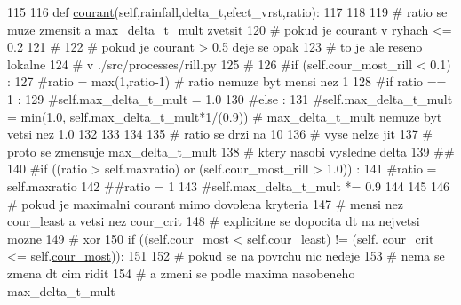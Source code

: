 \begin{DoxyCode}
115 
116   \textcolor{keyword}{def }\hyperlink{classsmoderp2d_1_1src_1_1courant_1_1Courant_a6a20926e1f36e2169eccdc27d92d787d}{courant}(self,rainfall,delta\_t,efect\_vrst,ratio):
117 
118 
119     \textcolor{comment}{# ratio se muze zmensit  a max\_delta\_t\_mult zvetsit}
120     \textcolor{comment}{# pokud je courant v ryhach <= 0.2}
121     \textcolor{comment}{#}
122     \textcolor{comment}{# pokud je courant > 0.5 deje se opak}
123     \textcolor{comment}{# to je ale reseno lokalne}
124     \textcolor{comment}{# v  ./src/processes/rill.py}
125     \textcolor{comment}{#}
126     \textcolor{comment}{#if (self.cour\_most\_rill < 0.1) :}
127       \textcolor{comment}{#ratio = max(1,ratio-1) # ratio nemuze byt mensi nez 1}
128       \textcolor{comment}{#if ratio == 1 :}
129         \textcolor{comment}{#self.max\_delta\_t\_mult = 1.0}
130       \textcolor{comment}{#else :}
131         \textcolor{comment}{#self.max\_delta\_t\_mult = min(1.0, self.max\_delta\_t\_mult*1/(0.9)) # max\_delta\_t\_mult nemuze byt
       vetsi nez 1.0}
132 
133 
134 
135     \textcolor{comment}{# ratio se drzi na 10}
136     \textcolor{comment}{# vyse nelze jit}
137     \textcolor{comment}{# proto se zmensuje max\_delta\_t\_mult}
138     \textcolor{comment}{# ktery nasobi vysledne delta}
139     \textcolor{comment}{##}
140     \textcolor{comment}{#if ((ratio > self.maxratio) or (self.cour\_most\_rill > 1.0)) :}
141       \textcolor{comment}{#ratio = self.maxratio}
142       \textcolor{comment}{##ratio = 1}
143       \textcolor{comment}{#self.max\_delta\_t\_mult *= 0.9}
144 
145 
146     \textcolor{comment}{# pokud je maximalni courant mimo dovolena kryteria}
147     \textcolor{comment}{# mensi nez cour\_least a vetsi nez cour\_crit}
148     \textcolor{comment}{# explicitne se dopocita dt na nejvetsi mozne}
149     \textcolor{comment}{#                                      xor}
150     \textcolor{keywordflow}{if} ((self.\hyperlink{classsmoderp2d_1_1src_1_1courant_1_1Courant_afa3e7bde711d11925d54a41ecffdc2f3}{cour\_most} < self.\hyperlink{classsmoderp2d_1_1src_1_1courant_1_1Courant_a87b5aad2d2f85e4af9046d7ea40913c8}{cour\_least}) !=  (self.
      \hyperlink{classsmoderp2d_1_1src_1_1courant_1_1Courant_a059271cdbd6044635ad290eadff9299b}{cour\_crit} <= self.\hyperlink{classsmoderp2d_1_1src_1_1courant_1_1Courant_afa3e7bde711d11925d54a41ecffdc2f3}{cour\_most})):
151 
152       \textcolor{comment}{# pokud se na povrchu nic nedeje}
153       \textcolor{comment}{# nema se zmena dt cim ridit}
154       \textcolor{comment}{# a zmeni se podle maxima nasobeneho max\_delta\_t\_mult}

\end{DoxyCode}
